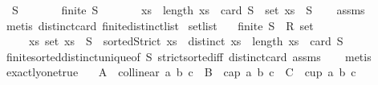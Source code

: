 \begin{isabellebody}
\endisatagproof
{\isafoldproof}%
%
\isadelimproof
\isanewline
%
\endisadelimproof
\isanewline
{}\isamarkupfalse%
\ \ S\isanewline
\ \ \ \ \ \ \ {\isachardoublequoteopen}finite\ S{\isachardoublequoteclose}\isanewline
\ \ \ \ \ \ \ {\isachardoublequoteopen}{\isasymexists}xs{\isachardot}{\kern0pt}\ \ length\ xs\ {\isacharequal}{\kern0pt}\ card\ S\ {\isasymand}\ set\ xs\ {\isacharequal}{\kern0pt}\ S{\isachardoublequoteclose}\isanewline
%
\isadelimproof
\ \ %
\endisadelimproof
%
\isatagproof
{}\isamarkupfalse%
\ assms\ \isanewline
\ \ \isamarkupfalse%
\ {\isacharparenleft}{\kern0pt}metis\ distinct{\isacharunderscore}{\kern0pt}card\ finite{\isacharunderscore}{\kern0pt}distinct{\isacharunderscore}{\kern0pt}list{\isacharparenright}{\kern0pt}%
\endisatagproof
{\isafoldproof}%
%
\isadelimproof
\isanewline
%
\endisadelimproof
\isanewline
{}\isamarkupfalse%
\ set{}list{\isacharcolon}{\kern0pt}\isanewline
\ \ \ {\isachardoublequoteopen}finite\ {\isacharparenleft}{\kern0pt}S\ {\isacharcolon}{\kern0pt}{\isacharcolon}{\kern0pt}\ R{}\ set{\isacharparenright}{\kern0pt}{\isachardoublequoteclose}\isanewline
\ \ \ \ \ {\isachardoublequoteopen}{\isasymexists}{\isacharbang}{\kern0pt}xs{\isachardot}{\kern0pt}\ set\ xs\ {\isacharequal}{\kern0pt}\ S\ {\isasymand}\ sortedStrict\ xs\ {\isasymand}\ distinct\ xs\ {\isasymand}\ length\ xs\ {\isacharequal}{\kern0pt}\ card\ S{\isachardoublequoteclose}\isanewline
%
\isadelimproof
\ \ %
\endisadelimproof
%
\isatagproof
{}\isamarkupfalse%
\ finite{\isacharunderscore}{\kern0pt}sorted{\isacharunderscore}{\kern0pt}distinct{\isacharunderscore}{\kern0pt}unique{\isacharbrackleft}{\kern0pt}of\ {\isachardoublequoteopen}S{\isachardoublequoteclose}{\isacharbrackright}{\kern0pt}\ strict{\isacharunderscore}{\kern0pt}sorted{\isacharunderscore}{\kern0pt}iff\ distinct{\isacharunderscore}{\kern0pt}card\ assms\isanewline
\ \ \isamarkupfalse%
\ metis%
\endisatagproof
{\isafoldproof}%
%
\isadelimproof
\isanewline
%
\endisadelimproof
\isanewline
{}\isamarkupfalse%
\ exactly{\isacharunderscore}{\kern0pt}one{\isacharunderscore}{\kern0pt}true{\isacharcolon}{\kern0pt}\isanewline
\ \ \ {\isachardoublequoteopen}A\ {\isacharequal}{\kern0pt}\ collinear{}\ a\ b\ c{\isachardoublequoteclose}\ \ {\isachardoublequoteopen}B\ {\isacharequal}{\kern0pt}\ cap{}\ a\ b\ c{\isachardoublequoteclose}\ \ {\isachardoublequoteopen}C\ {\isacharequal}{\kern0pt}\ cup{}\ a\ b\ c{\isachardoublequoteclose}\isanewline

\end{isabellebody}

